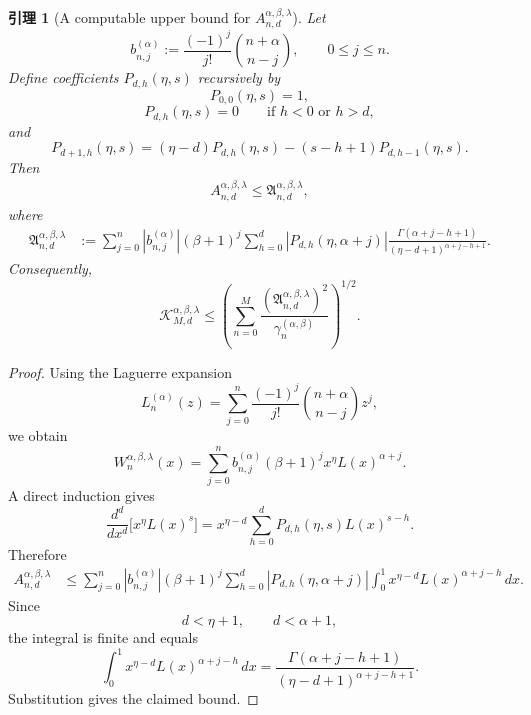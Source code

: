 \documentclass[UTF8]{ctexart}
\newtheorem{lemma}{引理}
\begin{document}
\begin{lemma}[A computable upper bound for $A_{n,d}^{\alpha,\beta,\lambda}$]
\label{lem:A-bound}
Let
\[
    b_{n,j}^{(\alpha)}
    :=
    \frac{(-1)^j}{j!}
    \binom{n+\alpha}{n-j},
    \qquad
    0\le j\le n.
\]
Define coefficients $P_{d,h}(\eta,s)$ recursively by
\[
    P_{0,0}(\eta,s)=1,
\]
\[
    P_{d,h}(\eta,s)=0
    \qquad
    \text{if }h<0\text{ or }h>d,
\]
and
\[
    P_{d+1,h}(\eta,s)
    =
    (\eta-d)P_{d,h}(\eta,s)
    -
    (s-h+1)P_{d,h-1}(\eta,s).
\]
Then
\[
\begin{aligned}
    A_{n,d}^{\alpha,\beta,\lambda}
    \le
    \mathfrak A_{n,d}^{\alpha,\beta,\lambda},
\end{aligned}
\]
where
\[
\boxed{
\begin{aligned}
    \mathfrak A_{n,d}^{\alpha,\beta,\lambda}
    &:=
    \sum_{j=0}^n
    \left|b_{n,j}^{(\alpha)}\right|
    (\beta+1)^j
    \sum_{h=0}^d
    \left|P_{d,h}(\eta,\alpha+j)\right|
    \frac{
    \Gamma(\alpha+j-h+1)
    }{
    (\eta-d+1)^{\alpha+j-h+1}
    } .
\end{aligned}
}
\]
Consequently,
\[
    \mathcal K_{M,d}^{\alpha,\beta,\lambda}
    \le
    \left(
    \sum_{n=0}^M
    \frac{
    \left(
    \mathfrak A_{n,d}^{\alpha,\beta,\lambda}
    \right)^2
    }{
    \gamma_n^{(\alpha,\beta)}
    }
    \right)^{1/2}.
\]
\end{lemma}

\begin{proof}
Using the Laguerre expansion
\[
    L_n^{(\alpha)}(z)
    =
    \sum_{j=0}^n
    \frac{(-1)^j}{j!}
    \binom{n+\alpha}{n-j}
    z^j,
\]
we obtain
\[
    W_n^{\alpha,\beta,\lambda}(x)
    =
    \sum_{j=0}^n
    b_{n,j}^{(\alpha)}
    (\beta+1)^j
    x^\eta L(x)^{\alpha+j}.
\]
A direct induction gives
\[
    \frac{d^d}{dx^d}
    \bigl[x^\eta L(x)^s\bigr]
    =
    x^{\eta-d}
    \sum_{h=0}^d
    P_{d,h}(\eta,s)L(x)^{s-h}.
\]
Therefore
\[
\begin{aligned}
    A_{n,d}^{\alpha,\beta,\lambda}
    &\le
    \sum_{j=0}^n
    \left|b_{n,j}^{(\alpha)}\right|
    (\beta+1)^j
    \sum_{h=0}^d
    \left|P_{d,h}(\eta,\alpha+j)\right|
    \int_0^1
    x^{\eta-d}
    L(x)^{\alpha+j-h}\,dx .
\end{aligned}
\]
Since
\[
    d<\eta+1,
    \qquad
    d<\alpha+1,
\]
the integral is finite and equals
\[
    \int_0^1
    x^{\eta-d}
    L(x)^{\alpha+j-h}\,dx
    =
    \frac{
    \Gamma(\alpha+j-h+1)
    }{
    (\eta-d+1)^{\alpha+j-h+1}
    }.
\]
Substitution gives the claimed bound.
\end{proof}
\end{document}

